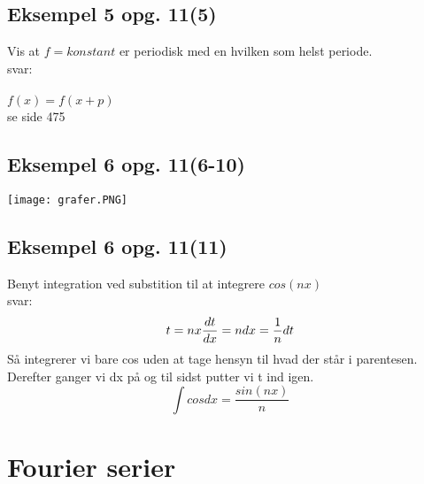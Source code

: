 \documentclass[11pt,fleqn]{book} %
\begin{document}
\subsection{Eksempel 5 opg. 11(5)}
Vis at $f=konstant$ er periodisk med en hvilken som  helst periode.\\
svar:\\\\
$f(x)=f(x+p)$\\
se side 475
\newpage
\subsection{Eksempel 6 opg. 11(6-10)}
\texttt{[image: grafer.PNG]}\\
\subsection{Eksempel 6 opg. 11(11)}
Benyt integration ved substition til at integrere $cos(nx)$\\
svar:
\begin{equation}
t = nx\\
\frac{dt}{dx} =n\\
dx =\frac{1}{n}dt
\end{equation}
Så integrerer vi bare cos uden at tage hensyn til hvad der står  i parentesen. Derefter ganger vi dx på og til sidst putter vi t ind igen. 
\begin{equation}
\int{ cos} dx=\frac{sin(nx)}{n}
\end{equation}
\section{Fourier serier}
\end{document}
